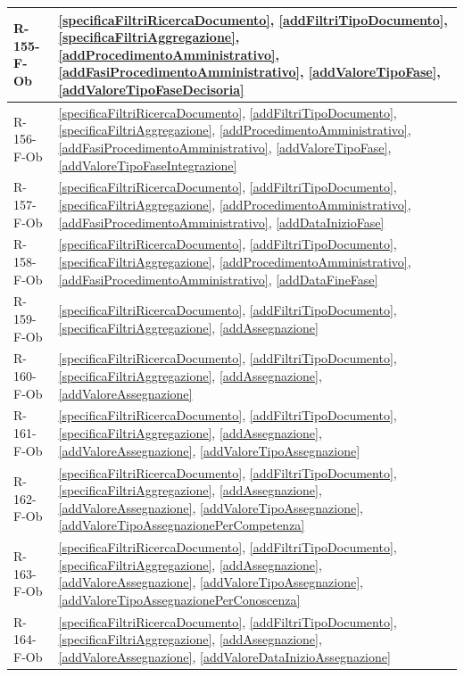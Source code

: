 \begin{longtable}{|p{4cm}|p{10cm}|}
\hline
R-155-F-Ob & \ref{specificaFiltriRicercaDocumento}, \ref{addFiltriTipoDocumento}, \ref{specificaFiltriAggregazione}, \ref{addProcedimentoAmministrativo}, \ref{addFasiProcedimentoAmministrativo}, \ref{addValoreTipoFase}, \ref{addValoreTipoFaseDecisoria} \\
\hline
R-156-F-Ob & \ref{specificaFiltriRicercaDocumento}, \ref{addFiltriTipoDocumento}, \ref{specificaFiltriAggregazione}, \ref{addProcedimentoAmministrativo}, \ref{addFasiProcedimentoAmministrativo}, \ref{addValoreTipoFase}, \ref{addValoreTipoFaseIntegrazione} \\
\hline
R-157-F-Ob & \ref{specificaFiltriRicercaDocumento}, \ref{addFiltriTipoDocumento}, \ref{specificaFiltriAggregazione}, \ref{addProcedimentoAmministrativo}, \ref{addFasiProcedimentoAmministrativo}, \ref{addDataInizioFase} \\
\hline
R-158-F-Ob & \ref{specificaFiltriRicercaDocumento}, \ref{addFiltriTipoDocumento}, \ref{specificaFiltriAggregazione}, \ref{addProcedimentoAmministrativo}, \ref{addFasiProcedimentoAmministrativo}, \ref{addDataFineFase} \\
\hline
R-159-F-Ob & \ref{specificaFiltriRicercaDocumento}, \ref{addFiltriTipoDocumento}, \ref{specificaFiltriAggregazione}, \ref{addAssegnazione} \\
\hline
R-160-F-Ob & \ref{specificaFiltriRicercaDocumento}, \ref{addFiltriTipoDocumento}, \ref{specificaFiltriAggregazione}, \ref{addAssegnazione}, \ref{addValoreAssegnazione} \\
\hline
R-161-F-Ob & \ref{specificaFiltriRicercaDocumento}, \ref{addFiltriTipoDocumento}, \ref{specificaFiltriAggregazione}, \ref{addAssegnazione}, \ref{addValoreAssegnazione}, \ref{addValoreTipoAssegnazione} \\
\hline
R-162-F-Ob & \ref{specificaFiltriRicercaDocumento}, \ref{addFiltriTipoDocumento}, \ref{specificaFiltriAggregazione}, \ref{addAssegnazione}, \ref{addValoreAssegnazione}, \ref{addValoreTipoAssegnazione}, \ref{addValoreTipoAssegnazionePerCompetenza} \\
\hline
R-163-F-Ob & \ref{specificaFiltriRicercaDocumento}, \ref{addFiltriTipoDocumento}, \ref{specificaFiltriAggregazione}, \ref{addAssegnazione}, \ref{addValoreAssegnazione}, \ref{addValoreTipoAssegnazione}, \ref{addValoreTipoAssegnazionePerConoscenza} \\
\hline
R-164-F-Ob & \ref{specificaFiltriRicercaDocumento}, \ref{addFiltriTipoDocumento}, \ref{specificaFiltriAggregazione}, \ref{addAssegnazione}, \ref{addValoreAssegnazione}, \ref{addValoreDataInizioAssegnazione} \\

\end{longtable}
